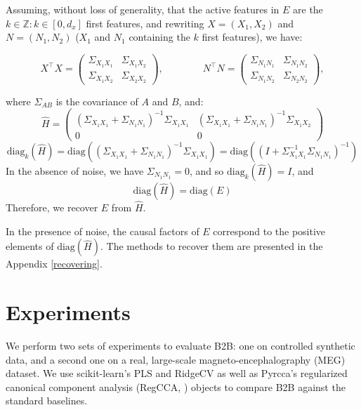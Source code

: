 \documentclass[preprint,12pt,3p]{elsarticle}
\begin{document}
Assuming, without loss of generality, that the active features in $E$ are the $k
\in \mathbb{Z}: k \in [0, d_x]$ first features, and rewriting $X=(X_1,X_2)$ and
$N=(N_1,N_2)$ ($X_1$ and $N_1$ containing the $k$ first features), we have:

\begin{equation}
  X^\top X = \left(\begin{array}{lccl}\Sigma_{X_1 X_1} & \Sigma_{X_1 X_2} \\ \Sigma_{X_1 X_2} & \Sigma_{X_2 X_2}\end{array}\right),\qquad\qquad N^\top N = \left(\begin{array}{lccl}\Sigma_{N_1 N_1} & \Sigma_{N_1 N_2} \\ \Sigma_{N_1 N_2} & \Sigma_{N_2 N_2}\end{array}\right),
\end{equation}

where $\Sigma_{A B}$ is the covariance of $A$ and $B$, and:
\begin{equation}
  \hat H = \left(\begin{array}{cc}(\Sigma_{X_1 X_1}+\Sigma_{N_1 N_1})^{-1}\Sigma_{X_1 X_1} & (\Sigma_{X_1 X_1}+\Sigma_{N_1 N_1})^{-1}\Sigma_{X_1 X_2} \\0 & 0\end{array}\right)
\end{equation}
\begin{equation}
  \text{diag}_k (\hat H) = \text{diag}((\Sigma_{X_1 X_1}+\Sigma_{N_1 N_1})^{-1}\Sigma_{X_1 X_1}) = \text{diag}((I+\Sigma_{X_1 X_1}^{-1}\Sigma_{N_1 N_1})^{-1})
  \label{eq:diagk}
\end{equation}
%
%
In the absence of noise, we have $\Sigma_{N_1 N_1}=0$, and so
$\text{diag}_k(\hat H)=I$, and $$\text{diag}(\hat H) = \text{diag}(E)$$
Therefore, we recover $E$ from $\hat H$.


In the presence of noise, the causal factors of $E$ correspond to the positive
elements of $\text{diag}(\hat H)$. The methods to recover them are presented in
the Appendix \ref{recovering}.

\section{Experiments}

We perform two sets of experiments to evaluate B2B: one on controlled synthetic
data, and a second one on a real, large-scale magneto-encephalography (MEG)
dataset.
%
We use scikit-learn's PLS and RidgeCV \citep{sklearn} as well as Pyrcca's
regularized canonical component analysis (RegCCA, \citep{bilenko2016pyrcca})
objects to compare B2B against the standard baselines.
\end{document}

